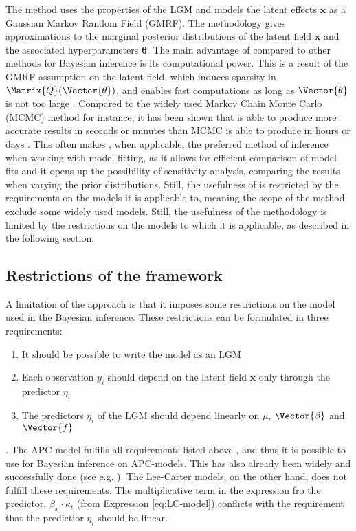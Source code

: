 \newpar The \inla method uses the properties of the LGM and models the latent effects $\mathbf{x}$ as a Gaussian Markov Random Field (GMRF). The methodology gives approximations to the marginal posterior distributions of the latent field $\mathbf{x}$ and the associated hyperparameters $\boldsymbol{\theta}$. The main advantage of \inla compared to other methods for Bayesian inference is its computational power. This is a result of the GMRF assumption on the latent field, which induces sparsity in $\Matrix{Q}(\Vector{\theta})$, and enables fast computations as long as $\Vector{\theta}$ is not too large \parencite{martinoRiebler2019}. Compared to the widely used Markov Chain Monte Carlo (MCMC) method for instance, it has been shown that \inla is able to produce more accurate results in seconds or minutes than MCMC is able to produce in hours or days \parencite{rue2009inla}.
This often makes \inla, when applicable, the preferred method of inference when working with model fitting, as it allows for efficient comparison of model fits and it opens up the possibility of sensitivity analysis, comparing the results when varying the prior distributions. Still, the usefulness of \inla is restricted by the requirements on the models it is applicable to, meaning the scope of the \inla method exclude some widely used models. Still, the usefulness of the \inla methodology is limited by the restrictions on the models to which it is applicable, as described in the following section.  

\subsection{Restrictions of the \inla framework}
\label{sec:InlaRestrictions}
A limitation of the \inla approach is that it imposes some restrictions on the model used in the Bayesian inference. These restrictions can be formulated in three requirements:
\begin{enumerate}
    \item It should be possible to write the model as an LGM
    \item Each observation $y_i$ should depend on the latent field $\textbf{x}$ only through the predictor $\eta_i$ 
    \item The predictors $\eta_i$ of the LGM should depend linearly on $\mu$, $\Vector{\beta}$ and $\Vector{f}$
    \label{item:inlaRequirements}
\end{enumerate}
\parencite{martinoRiebler2019}.
\newpar The APC-model fulfills all requirements listed above \parencite{rieblerHeld2010}, and thus it is possible to use \inla for Bayesian inference on APC-models. This has also already been widely and successfully done (see e.g. \textcite{RieblerThesis2010}). The Lee-Carter models, on the other hand, does not fulfill these requirements. The multiplicative term in the expression fro the predictor, $\beta_x\cdot \kappa_t$ (from Expression \ref{eq:LC-model}) conflicts with the requirement that the predictior $\eta_i$ should be linear.  
   
